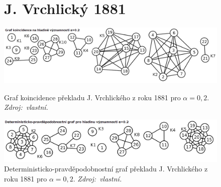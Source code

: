 \documentclass[dp.tex]{subfiles}
\begin{document}
\begin{figure}[h]
\section*{J. Vrchlický 1881}
	\centering
	\includegraphics[max width=\textwidth,keepaspectratio=true]{imgs-99-priloha-d/b_k_20}
	\caption[Graf koincidence překladu J. Vrchlického z roku 1881 pro $\alpha = 0{,}2$]
            {Graf koincidence překladu J. Vrchlického z roku 1881 pro $\alpha = 0{,}2$. \textit{Zdroj:~vlastní.}}
	\label{fig:b_k_20}

	\includegraphics[max width=\textwidth,keepaspectratio=true]{imgs-99-priloha-d/b_d_20}
	\caption[Deterministicko-pravděpodobnostní graf překladu J. Vrchlického z roku 1881 pro $\alpha = 0{,}2$]
            {Deterministicko-pravděpodobnostní graf překladu J. Vrchlického z roku 1881 pro $\alpha = 0{,}2$. \textit{Zdroj:~vlastní.}}
	\label{fig:b_d_20}
\end{figure}
\end{document}
